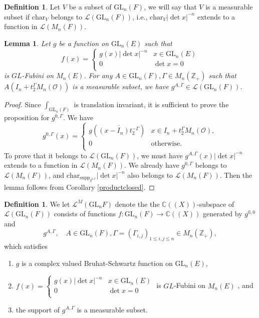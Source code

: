 \documentclass{amsart}
\newtheorem{lemma}[theorem]{Lemma}
\theoremstyle{definition}
\newtheorem{definition}[theorem]{Definition}
\theoremstyle{remark}
\numberwithin{equation}{section}
\def  \Char     {\mathrm{char}}
\def  \GL        {\mathrm{GL}}
\def  \supp     {\mathrm{supp}}
\def  \cl       {\mathcal{L}}
\def  \co       {\mathcal{O}}
\def  \bc       {\mathbb{C}}
\def  \bz       {\mathbb{Z}}
\begin{document}
\begin{definition}
	Let $V$  be a subset of $\GL_n(F)$,  we  will say  that $V$ is a measurable subset if $\Char_V$
	belongs to $\cl(\GL_n(F))$, i.e., $ \Char_V |\det x|^{-n}$ extends to a function in $\cl(M_n(F))$.
\end{definition}




\begin{lemma}
Let $g$ be a function on $\GL_n(E)$ such that  
$$
f(x)=\left\{ 
\begin{array}{ll}
	g(x) |\det x|^{-n}  &   x \in \GL_n(E) \\
	0          &    \det x  =0  \\
\end{array}
\right.
$$
is  $GL$-Fubini on $M_n(E)$. For any $A \in  \GL_n(F), \Gamma \in M_n(\bz_{+})$ such that  $A(I_n+t_2^{\Gamma} M_n(\co))$ is  a measurable subset, we have $g^{A, \Gamma}    \in \cl(\GL_n(F))$.
\end{lemma}
\begin{proof}
	Since $\int_{\GL_n(F)}$ is translation invariant, it is sufficient to prove the proposition for $g^{0,\Gamma}$.
	We have
	$$
	g^{0, \Gamma}(x) = \left\{
	\begin{array}{ll}
		g(\overline{(x-I_n) t_2^{-\Gamma}})  &   x   \in  I_n+ t_2^{\Gamma} M_n(\co),  \\
		0   &  \text{otherwise}. \\  
	\end{array}
	\right.
	$$
	To prove that it belongs to $\cl(\GL_n(F))$,  we must have  $g^{A ,\Gamma}(x) |\det x|^{-n}$ extends to a function in $\cl(M_n(F))$. We already have $g^{0, \Gamma}$ belongs to $\cl(M_n(F))$, and $\Char_{\supp_{g^{0, \Gamma }}  } |\det x|^{-n}$ also belongs to $\cl(M_n(F))$.  Then the lemma follows from Corollary \ref{productclosed}.
	
\end{proof}


\begin{definition}
	We let $\cl^M(\GL_n F)$  denote  the  the  $\bc((X))$-subspace of $\cl(\GL_n(F))$ consists of  functions $f: \GL_n (F) \to \bc((X))$ generated by $g^{0,0}$ and
	$$
	g^{A, \Gamma},   \quad  A  \in \GL_n(F),   \Gamma = (\Gamma_{i,j})_{1\leq i,j  \leq n} \in M_n(\bz_+),
	$$	 
	which  satisfies 
		\begin{enumerate}

	 \item   $g$ is a complex valued Bruhat-Schwartz function on $\GL_n(E)$,
		\item  $
		f(x)=\left\{ 
		\begin{array}{ll}
			g(x) |\det x|^{-n}  &   x \in \GL_n(E) \\
			0          &    \det x  =0  \\
		\end{array}
		\right.
		$
		is  $GL$-Fubini on $M_n(E)$ , and
    \item   the support  of $g^{A, \Gamma}$ is a measurable subset.
	\end{enumerate}
	
\end{definition}
\end{document}
